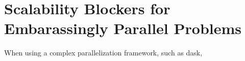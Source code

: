 \section{Scalability Blockers for Embarassingly Parallel Problems}

When using a complex parallelization framework, such as dask, 

